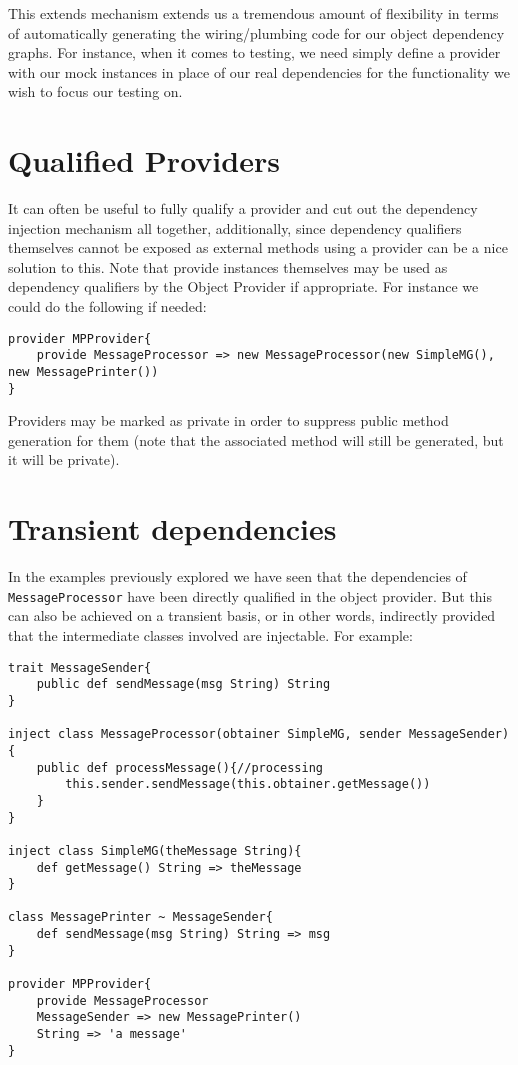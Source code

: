 \documentclass[conc-doc]{subfiles}
\begin{document}
This extends mechanism extends us a tremendous amount of flexibility in terms of automatically generating the wiring/plumbing code for our object dependency graphs. For instance, when it comes to testing, we need simply define a provider with our mock instances in place of our real dependencies for the functionality we wish to focus our testing on.

\section{Qualified Providers}
It can often be useful to fully qualify a provider and cut out the dependency injection mechanism all together, additionally, since dependency qualifiers themselves cannot be exposed as external methods using a provider can be a nice solution to this. Note that provide instances themselves may be used as dependency qualifiers by the Object Provider if appropriate. For instance we could do the following if needed:

\begin{lstlisting}
provider MPProvider{
	provide MessageProcessor => new MessageProcessor(new SimpleMG(), new MessagePrinter())
}
\end{lstlisting}

Providers may be marked as private in order to suppress public method generation for them (note that the associated method will still be generated, but it will be private).

\section{Transient dependencies}
In the examples previously explored we have seen that the dependencies of \lstinline{MessageProcessor} have been directly qualified in the object provider. But this can also be achieved on a transient basis, or in other words, indirectly provided that the intermediate classes involved are injectable. For example:

\begin{lstlisting}
trait MessageSender{
	public def sendMessage(msg String) String
}

inject class MessageProcessor(obtainer SimpleMG, sender MessageSender){
	public def processMessage(){//processing
		this.sender.sendMessage(this.obtainer.getMessage())
	}
}

inject class SimpleMG(theMessage String){
	def getMessage() String => theMessage
}

class MessagePrinter ~ MessageSender{
	def sendMessage(msg String) String => msg
}

provider MPProvider{
	provide MessageProcessor
	MessageSender => new MessagePrinter()
	String => 'a message'
}
\end{lstlisting}
\end{document}
